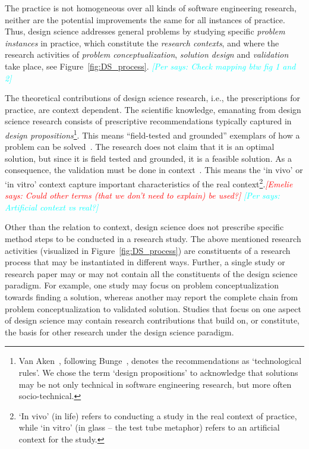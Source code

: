 \documentclass[graybox]{svmult}
\newcommand{\emelie}[1]{\textcolor{red}{{\it [Emelie says: #1]}}}
\newcommand{\per}[1]{\textcolor{cyan}{{\it [Per says: #1]}}}
\newcommand{\emelie}[1]{}
\newcommand{\per}[1]{}
\begin{document}
The practice is not homogeneous over all kinds of software engineering research, neither are the potential improvements the same for all instances of practice. Thus, design science addresses general problems by studying specific \emph{problem instances} in practice, which constitute the \emph{research contexts}, and where the research activities of \emph{problem conceptualization}, \emph{solution design} and \emph{validation} take place, see Figure~\ref{fig:DS_process}. \per{Check mapping btw fig 1 and 2}


The theoretical contributions of design science research, i.e., the prescriptions for practice, are context dependent. The scientific knowledge, emanating from design science research consists of prescriptive recommendations typically captured in \emph{design propositions}\footnote{Van Aken~\cite{van_aken_management_2004}, following Bunge~\cite{bunge_philosophy_1998}, denotes the recommendations as `technological rules'. We chose the term `design propositions' to acknowledge that solutions may be not only technical in software engineering research, but more often socio-technical.}. This means ``field-tested and grounded'' exemplars of how a problem can be solved~\cite{van_aken_management_2004}. The research does not claim that it is an optimal solution, but since it is field tested and grounded, it is a feasible solution.
As a consequence, the validation must be done in context~\cite{wieringa_what_2014}.  This means the `in vivo' or `in vitro' context capture important characteristics of the real context\footnote{`In vivo' (in life) refers to conducting a study in the real context of practice, while `in vitro' (in glass -- the test tube metaphor) refers to an artificial context for the study.}.\emelie{Could other terms (that we don't need to explain) be used?}   \per{Artificial context vs real?}





Other than the relation to context, design science does not prescribe specific method steps to be conducted in a research study. The above mentioned research activities (visualized in Figure~\ref{fig:DS_process}) are constituents of a research process that may be instantiated in different ways. 
Further, a single study or research paper may or may not contain all the constituents of the design science paradigm. For example, one study may focus on problem conceptualization towards finding a solution, whereas another may report the complete chain from problem conceptualization to validated solution. Studies that focus on one aspect of design science may contain research contributions that build on, or constitute, the basis for other research under the design science paradigm.
\end{document}
